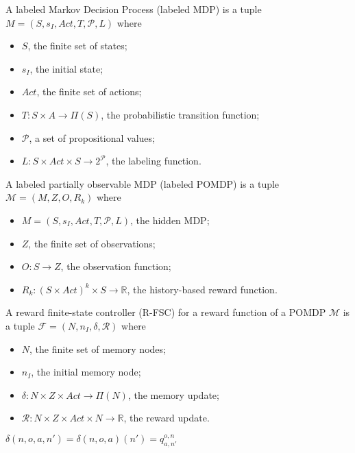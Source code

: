 \begin{definition}
	A labeled Markov Decision Process (labeled MDP) is a tuple $M=(S,s_I,Act,T,\mathcal{P},L)$ where 
	\begin{itemize}
		\item $S$, the finite set of states;
		\item $s_I$, the initial state;
		\item $Act$, the finite set of actions;
		\item $T:S\times A\to \Pi(S)$, the probabilistic transition function;
		\item $\mathcal{P}$, a set of propositional values;
		\item $L:S\times Act\times S\to 2^\mathcal{P}$, the labeling function.
	\end{itemize}
\end{definition}


\begin{definition}
	A labeled partially observable MDP (labeled POMDP) is a tuple $\mathcal{M}=(M, Z, O, R_k)$ where 
	\begin{itemize}
		\item $M=(S,s_I,Act,T,\mathcal{P},L)$, the hidden MDP;
		\item $Z$, the finite set of observations;
		\item $O:S\to Z$, the observation function;
		\item $R_k:(S\times Act)^k\times S \to \mathbb{R}$, the history-based reward function.
	\end{itemize}
\end{definition}

\begin{definition}
	A reward finite-state controller (R-FSC) for a reward function of a POMDP $\mathcal{M}$ is a tuple $\mathcal{F}=(N,n_I,\delta,\mathcal{R})$ where
	\begin{itemize}
		\item $N$, the finite set of memory nodes;
		\item $n_I$, the initial memory node;
		\item $\delta: N \times Z \times Act \to \Pi(N)$, the memory update;
		\item $\mathcal{R}: N \times Z \times Act\times N \to \mathbb{R}$, the reward update. 
	\end{itemize}
\end{definition}

$\delta(n,o,a,n')=\delta(n,o,a)(n') = q^{o,n}_{a,n'}$

